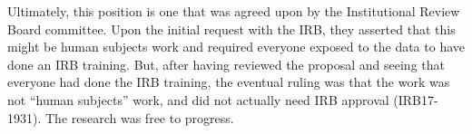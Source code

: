 Ultimately, this position is one that was agreed upon by the Institutional Review Board committee.  Upon the initial request with the IRB, they asserted that this might be human subjects work and required everyone exposed to the data to have done an IRB training.  But, after having reviewed the proposal and seeing that everyone had done the IRB training, the eventual ruling was that the work was not “human subjects” work, and did not actually need IRB approval (IRB17-1931).  The research was free to progress.
